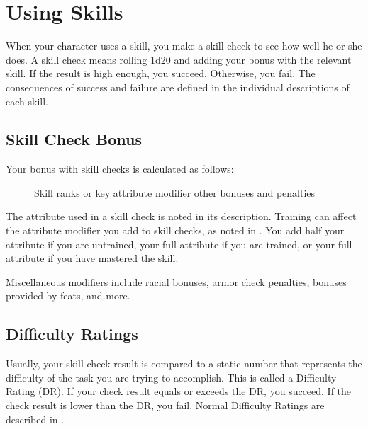 \section{Using Skills}

    When your character uses a skill, you make a skill check to see how well he or she does. A skill check means rolling 1d20 and adding your bonus with the relevant skill. If the result is high enough, you succeed. Otherwise, you fail. The consequences of success and failure are defined in the individual descriptions of each skill.

    \subsection{Skill Check Bonus}

        Your bonus with skill checks is calculated as follows:

        \begin{figure}[h]
            \centering Skill ranks or key attribute modifier \add other bonuses and penalties
        \end{figure}

         The attribute used in a skill check is noted in its description.
        Training can affect the attribute modifier you add to skill checks, as noted in .
        You add half your attribute if you are untrained, your full attribute if you are trained, or your full attribute  if you have mastered the skill.

         Miscellaneous modifiers include racial bonuses, armor check penalties, bonuses provided by feats, and more.

    \subsection{Difficulty Ratings}

        Usually, your skill check result is compared to a static number that represents the difficulty of the task you are trying to accomplish.
        This is called a Difficulty Rating (DR).
        If your check result equals or exceeds the DR, you succeed.
        If the check result is lower than the DR, you fail.
        Normal Difficulty Ratings are described in .

